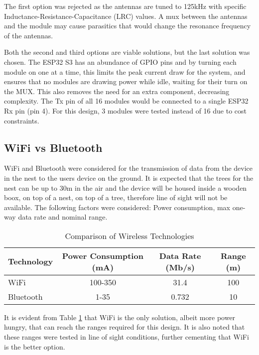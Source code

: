 \documentclass[class=report,11pt,crop=false]{standalone}
\begin{document}
The first option was rejected as the antennas are tuned to 125kHz with specific Inductance-Resistance-Capacitance (LRC) values. A mux between the antennas and the module may cause parasitics that would change the resonance frequency of the antennas.

Both the second and third options are viable solutions, but the last solution was chosen. The ESP32 S3 has an abundance of GPIO pins and by turning each module on one at a time, this limits the peak current draw for the system, and ensures that no modules are drawing power while idle, waiting for their turn on the MUX. This also removes the need for an extra component, decreasing complexity. The Tx pin of all 16 modules would be connected to a single ESP32 Rx pin (pin 4). For this design, 3 modules were tested instead of 16 due to cost constraints.

\subsection*{WiFi vs Bluetooth}

WiFi and Bluetooth were considered for the transmission of data from the device in the nest to the users device on the ground. It is expected that the trees for the nest can be up to 30m in the air and the device will be housed inside a wooden boox, on top of a nest, on top of a tree, therefore line of sight will not be available. The following factors were considered: Power consumption, max one-way data rate and nominal range.

\begin{table}[htbp]
    \centering
    {\begin{tabular}{|l|c|c|c|}
        \hline
        \textbf{Technology} & \textbf{Power Consumption (mA)} & \textbf{Data Rate (Mb/s)} & \textbf{Range (m)} \\
        \hline
        WiFi & 100-350 & 31.4 & 100 \\
        \hline
        Bluetooth & 1-35 & 0.732 & 10 \\
        \hline
    \end{tabular}}
    \caption{Comparison of Wireless Technologies \cite{WIFIvsBLUE}}
    \label{tab:wifi_bluetooth_comparison}
\end{table}

It is evident from Table \ref{tab:wifi_bluetooth_comparison} that WiFi is the only solution, albeit more power hungry, that can reach the ranges required for this design. It is also noted that these ranges were tested in line of sight conditions, further cementing that WiFi is the better option.
\end{document}
